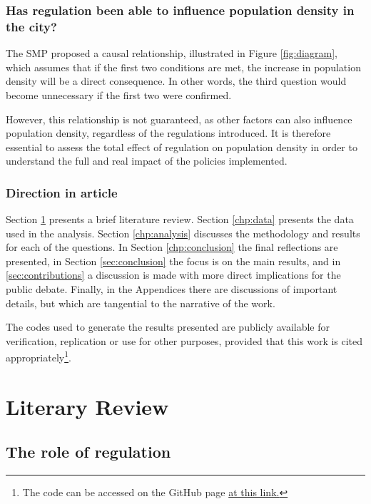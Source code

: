 \subsection*{Has regulation been able to influence population density in the city?}

The SMP proposed a causal relationship, illustrated in Figure \ref{fig:diagram}, which assumes that if the first two conditions are met, the increase in population density will be a direct consequence. In other words, the third question would become unnecessary if the first two were confirmed.

However, this relationship is not guaranteed, as other factors can also influence population density, regardless of the regulations introduced. It is therefore essential to assess the total effect of regulation on population density in order to understand the full and real impact of the policies implemented.

\subsection*{Direction in article}

Section \ref{chp:review} presents a brief literature review. Section \ref{chp:data} presents the data used in the analysis. Section \ref{chp:analysis} discusses the methodology and results for each of the questions. In Section \ref{chp:conclusion} the final reflections are presented, in Section \ref{sec:conclusion} the focus is on the main results, and in \ref{sec:contributions} a discussion is made with more direct implications for the public debate. Finally, in the Appendices there are discussions of important details, but which are tangential to the narrative of the work.

The codes used to generate the results presented are publicly available for verification, replication or use for other purposes, provided that this work is cited appropriately\footnote{The code can be accessed on the GitHub page \href{https://github.com/gustavo-tm}{at this link.}}.


\chapter{Literary Review}
\label{chp:review}

\section{The role of regulation}

